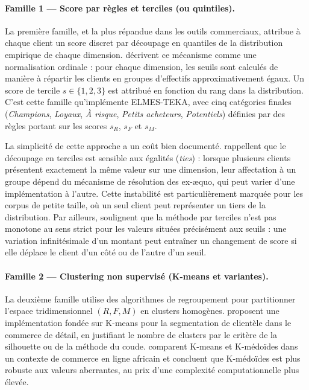 \paragraph{Famille 1 — Score par règles et terciles (ou quintiles).}
La première famille, et la plus répandue dans les outils commerciaux, attribue à chaque
client un score discret par découpage en quantiles de la distribution empirique de chaque
dimension. \citet{Salminen2023} décrivent ce mécanisme comme une normalisation ordinale :
pour chaque dimension, les seuils sont calculés de manière à répartir les clients en groupes
d'effectifs approximativement égaux. Un score de tercile $s \in \{1, 2, 3\}$ est attribué en
fonction du rang dans la distribution. C'est cette famille qu'implémente ELMES-TEKA, avec
cinq catégories finales (\emph{Champions}, \emph{Loyaux}, \emph{À risque},
\emph{Petits acheteurs}, \emph{Potentiels}) définies par des règles portant sur les scores
$s_R$, $s_F$ et $s_M$.

La simplicité de cette approche a un coût bien documenté. \citet{ViannaFilho2026} rappellent
que le découpage en terciles est sensible aux égalités (\emph{ties}) : lorsque plusieurs
clients présentent exactement la même valeur sur une dimension, leur affectation à un groupe
dépend du mécanisme de résolution des ex-æquo, qui peut varier d'une implémentation à
l'autre. Cette instabilité est particulièrement marquée pour les corpus de petite taille, où
un seul client peut représenter un tiers de la distribution. Par ailleurs, \citet{Sobantu2025}
soulignent que la méthode par terciles n'est pas monotone au sens strict pour les valeurs
situées précisément aux seuils : une variation infinitésimale d'un montant peut entraîner un
changement de score si elle déplace le client d'un côté ou de l'autre d'un seuil.

\paragraph{Famille 2 — Clustering non supervisé (K-means et variantes).}
La deuxième famille utilise des algorithmes de regroupement pour partitionner l'espace
tridimensionnel $(R, F, M)$ en clusters homogènes. \citet{Rajendran2024} proposent une
implémentation fondée sur K-means pour la segmentation de clientèle dans le commerce de
détail, en justifiant le nombre de clusters par le critère de la silhouette ou de la
méthode du coude. \citet{Sobantu2025} comparent K-means et K-médoïdes dans un contexte de
commerce en ligne africain et concluent que K-médoïdes est plus robuste aux valeurs
aberrantes, au prix d'une complexité computationnelle plus élevée.

